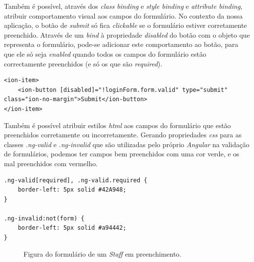 Também é possível, através dos \textit{class binding} e \textit{style binding} e \textit{attribute binding}, atribuir comportamento visual aos campos do formulário. No contexto da nossa aplicação, o botão de \textit{submit} só fica \textit{clickable} se o formulário estiver corretamente preenchido.  Através de um \textit{bind} à propriedade \textit{disabled} do botão com o objeto que representa o formulário, pode-se adicionar este comportamento ao botão, para que ele só seja \textit{enabled} quando todos os campos do formulário estão correctamente preenchidos (e só os que são \textit{required}). 

\begin{lstlisting}
<ion-item>
	<ion-button [disabled]="!loginForm.form.valid" type="submit" class="ion-no-margin">Submit</ion-button>
</ion-item>
\end{lstlisting}

Também é possível atribuir estilos \textit{html} aos campos do formulário que estão preenchidos corretamente ou incorretamente. Gerando propriedades \textit{css} para as classes \textit{.ng-valid} e \textit{.ng-invalid} que são utilizadas pelo próprio \textit{Angular} na validação de formulários, podemos ter campos bem preenchidos com uma cor verde, e os mal preenchidos com vermelho. 

\begin{lstlisting}
.ng-valid[required], .ng-valid.required {
	border-left: 5px solid #42A948;
}

.ng-invalid:not(form) {
	border-left: 5px solid #a94442;
}
\end{lstlisting}

\begin{figure}[h]
	\begin{center}
	\end{center}
	\caption{Figura do formulário de um \textit{Staff} em preenchimento.}\label{fig:formpost}
\end{figure}

